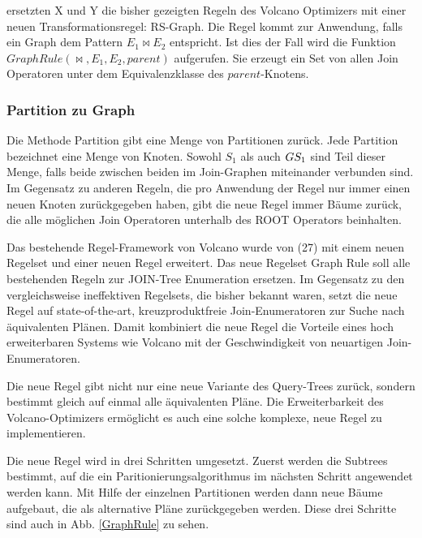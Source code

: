 ersetzten X und Y die bisher gezeigten Regeln des Volcano Optimizers mit einer neuen Transformationsregel: RS-Graph. Die Regel kommt zur Anwendung, falls ein Graph dem Pattern $E_1 \Join E_2$ entspricht. Ist dies der Fall wird die Funktion $GraphRule(\Join, E_1, E_2, parent)$ aufgerufen. Sie erzeugt ein Set von allen Join Operatoren unter dem Equivalenzklasse des $parent$-Knotens.







\subsubsection{Partition zu Graph}



Die Methode Partition gibt eine Menge von Partitionen zurück. Jede Partition bezeichnet eine Menge von Knoten. Sowohl $S_1$ als auch $G\\S_1$ sind Teil dieser Menge, falls beide zwischen beiden im Join-Graphen miteinander verbunden sind. Im Gegensatz zu anderen Regeln, die pro Anwendung der Regel nur immer einen neuen Knoten zurückgegeben haben, gibt die neue Regel immer Bäume zurück, die alle möglichen Join Operatoren unterhalb des ROOT Operators beinhalten.





Das bestehende Regel-Framework von Volcano wurde von (27) mit einem neuen Regelset und einer neuen Regel erweitert. Das neue Regelset Graph Rule soll alle bestehenden Regeln zur JOIN-Tree Enumeration ersetzen. Im Gegensatz zu den vergleichsweise ineffektiven Regelsets, die bisher bekannt waren, setzt die neue Regel auf state-of-the-art, kreuzproduktfreie Join-Enumeratoren zur Suche nach äquivalenten Plänen. Damit kombiniert die neue Regel die Vorteile eines hoch erweiterbaren Systems wie Volcano mit der Geschwindigkeit von neuartigen Join-Enumeratoren.

Die neue Regel gibt nicht nur eine neue Variante des Query-Trees zurück, sondern bestimmt gleich auf einmal alle äquivalenten Pläne. Die Erweiterbarkeit des Volcano-Optimizers ermöglicht es auch eine solche komplexe, neue Regel zu implementieren.

Die neue Regel wird in drei Schritten umgesetzt. Zuerst werden die Subtrees bestimmt, auf die ein Paritionierungsalgorithmus im nächsten Schritt angewendet werden kann. Mit Hilfe der einzelnen Partitionen werden dann neue Bäume aufgebaut, die als alternative Pläne zurückgegeben werden. Diese drei Schritte sind auch in Abb. \ref{GraphRule} zu sehen.

